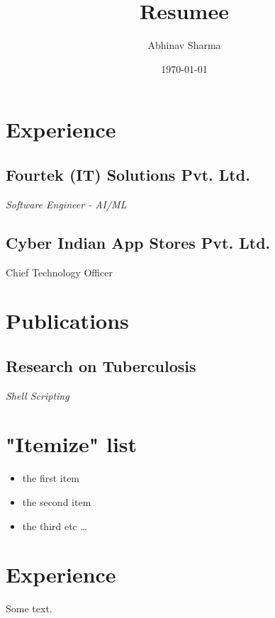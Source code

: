 \documentclass{article}%
\title{Resumee}%
\author{Abhinav Sharma}%
\date{\today}%
\begin{document}
%
\normalsize%
\maketitle%
\section{Experience}%
\label{sec:Experience}%
\subsection{Fourtek (IT) Solutions Pvt. Ltd.}%
\label{subsec:Fourtek (IT) Solutions Pvt. Ltd.}%
\textit{Software Engineer {-} AI/ML}

%
\subsection{Cyber Indian App Stores Pvt. Ltd.}%
\label{subsec:Cyber Indian App Stores Pvt. Ltd.}%
Chief Technology Officer

%
\section{Publications}%
\label{sec:Publications}%
\subsection{Research on Tuberculosis}%
\label{subsec:Research on Tuberculosis}%
\textit{Shell Scripting}

%
\section{"Itemize" list}%
\label{sec:Itemize list}%
\begin{itemize}%
\item%
the first item%
\item%
the second item%
\item%
the third etc%
\ldots%
\end{itemize}

%
\section{Experience}%
\label{sec:Experience}%
Some text.

%
\end{document}
